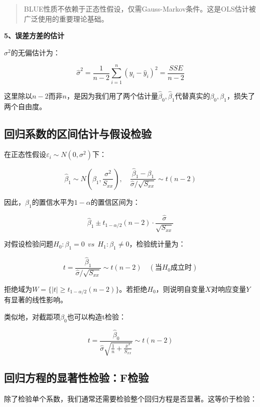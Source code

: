 \documentclass[
]{book}
\begin{document}
\begin{quote}
BLUE性质不依赖于正态性假设，仅需Gauss-Markov条件。这是OLS估计被广泛使用的重要理论基础。
\end{quote}

\textbf{5、误差方差的估计}

\(\sigma^2\)的无偏估计为：

\[
\hat{\sigma}^2 = \frac{1}{n-2} \sum_{i=1}^n (y_i - \hat{y}_i)^2 = \frac{SSE}{n-2}
\]

这里除以\(n-2\)而非\(n\)，是因为我们用了两个估计量\(\hat{\beta}_0, \hat{\beta}_1\)代替真实的\(\beta_0, \beta_1\)，损失了两个自由度。

\subsection{回归系数的区间估计与假设检验}\label{ux56deux5f52ux7cfbux6570ux7684ux533aux95f4ux4f30ux8ba1ux4e0eux5047ux8bbeux68c0ux9a8c}

在正态性假设\(\varepsilon_i \sim N(0, \sigma^2)\)下：

\[
\hat{\beta}_1 \sim N\left(\beta_1, \frac{\sigma^2}{S_{xx}}\right), \quad \frac{\hat{\beta}_1 - \beta_1}{\hat{\sigma} / \sqrt{S_{xx}}} \sim t(n-2)
\]

因此，\(\beta_1\)的置信水平为\(1-\alpha\)的置信区间为：

\[
\hat{\beta}_1 \pm t_{1-\alpha/2}(n-2) \cdot \frac{\hat{\sigma}}{\sqrt{S_{xx}}}
\]

对假设检验问题\(H_0: \beta_1 = 0 \ \ vs \ \ H_1: \beta_1 \neq 0\)，检验统计量为：

\[
t = \frac{\hat{\beta}_1}{\hat{\sigma} / \sqrt{S_{xx}}} \sim t(n-2) \quad (\text{当}H_0\text{成立时})
\]

拒绝域为\(W = \{|t| \geq t_{1-\alpha/2}(n-2)\}\)。若拒绝\(H_0\)，则说明自变量\(X\)对响应变量\(Y\)有显著的线性影响。

类似地，对截距项\(\beta_0\)也可以构造t检验：

\[
t = \frac{\hat{\beta}_0}{\hat{\sigma} \sqrt{\frac{1}{n} + \frac{\bar{x}^2}{S_{xx}}}} \sim t(n-2)
\]

\subsection{回归方程的显著性检验：F检验}\label{ux56deux5f52ux65b9ux7a0bux7684ux663eux8457ux6027ux68c0ux9a8cfux68c0ux9a8c}

除了检验单个系数，我们通常还需要检验整个回归方程是否显著。这等价于检验：
\end{document}
